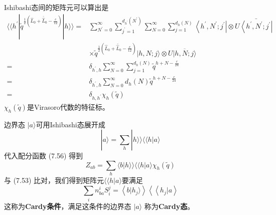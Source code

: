 Ishibashi态间的矩阵元可以算出是
\begin{equation}
	\begin{aligned} \langle \langle h^{\prime} |\tilde{q}^{\frac{1}{2}\left(\hat{L}_{0}+\bar{\hat{L}}_{0}-\frac{c}{12}\right)} | h \rangle \rangle=& \sum_{N^{\prime}=0}^{\infty} \sum_{j^{\prime}=1}^{d_{h^{\prime}}\left(N^{\prime}\right)} \sum_{N=0}^{\infty} \sum_{j=1}^{d_{h}(N)}\left\langle h^{\prime}, N^{\prime} ; j^{\prime}\right| \otimes U \bar{\left\langle h^{\prime}, N^{\prime} ; j^{\prime}\right|} \\ & \times \tilde{q}^{\frac{1}{2}\left(\hat{L}_{0}+\bar{\hat{L}}_{0}-\frac{c}{12}\right)}|h, N ; j\rangle \otimes U \overline{|h, N ; j\rangle} \\ =& \delta_{h^{\prime}, h} \sum_{N=0}^{\infty} \sum_{j=1}^{d_{h}(N)} \tilde{q}^{h+N-\frac{c}{24}} \\ =& \delta_{h^{\prime}, h} \sum_{N=0}^{\infty} d_{h}(N) \tilde{q}^{h+N-\frac{c}{24}} \\ =& \delta_{h, h^{\prime}} \chi_{h}(\tilde{q}) \end{aligned}
\end{equation} 
$\chi_{h}(\tilde{q}) $是Virasoro代数的特征标。

边界态 $|a\rangle $可用Ishibashi态展开成
\begin{equation}
	|a\rangle=\sum_{h}|h\rangle \rangle\langle\langle h |a\rangle
\end{equation}
代入配分函数 (7.56) 得到
\begin{equation}
	Z_{ab}=\sum_{h}\langle b | h\rangle \rangle \langle\langle h |a\rangle \chi_{h}(\tilde{q})
\end{equation} 
与 (7.53) 比对，我们得到矩阵元$ \langle\langle h |a\rangle $要满足
\begin{equation}
	\sum_{i} n_{b a}^{i} S_{i}^{j}=\left\langle b | h_{j} \rangle\right\rangle\left\langle\left\langle h_{j} |a\right\rangle\right.
\end{equation}
这称为\textbf{Cardy条件}，满足这条件的边界态 $|a\rangle$ 称为\textbf{Cardy态}。

